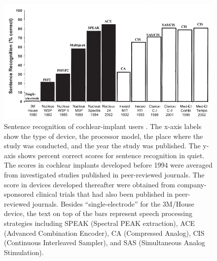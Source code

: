 \documentclass[letter,11pt]{article}
\begin{document}
\begin{figure}[hbtp]
\centering
\includegraphics[width=5in]{neuro2.png}

\caption{\justify Sentence recognition of cochlear-implant users \cite{Zeng2004}. The
x-axis labels show the type of device, the processor model, the place where the
study was conducted, and the year the study was published. The y-axis shows
percent correct scores for sentence recognition in quiet. The scores in
cochlear implants developed before 1994 were averaged from investigated studies
published in peer-reviewed journals. The score in devices developed thereafter
were obtained from company-sponsored clinical trials that had also been
published in peer-reviewed journals. Besides ``single-electrode'' for the
3M/House device, the text on top of the bars represent speech processing
strategies including SPEAK (Spectral PEAK extraction), ACE (Advanced
Combination Encoder), CA (Compressed Analog), CIS (Continuous Interleaved
Sampler), and SAS (Simultaneous Analog Stimulation).}
\label{neuro2}
\end{figure}
 

\end{document}
